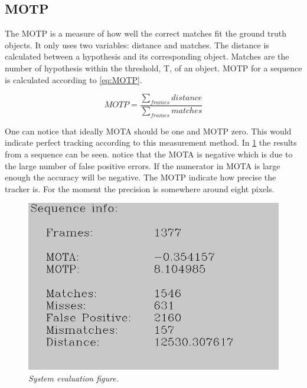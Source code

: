 \subsection{MOTP}
The MOTP is a measure of how well the correct matches fit the ground truth objects. It only uses two variables: distance and matches. The distance is calculated between a hypothesis and its corresponding object. Matches are the number of hypothesis within the 
threshold, T, of an object. MOTP for a sequence is calculated according to \eqref{eq:MOTP}.

\begin{equation}
\label{eq:MOTP}
MOTP = \frac{\sum_{frames}{distance}}{\sum_{frames}{matches}}
\end{equation}

One can notice that ideally MOTA should be one and MOTP zero. This would indicate perfect tracking according to this measurement method. In \ref{fig:system_evaluation_fig} the results from a sequence can be seen. notice that the MOTA is negative which is due to the large number of false positive errors. If the numerator in MOTA is large enough the accuracy will be negative. The MOTP indicate how precise the tracker is. For the moment the precision is somewhere around eight pixels.

\newpage
\begin{figure}[htb]
	\centering
	\includegraphics[width=\linewidth]{images/sequenceEvaluation}
	\caption{\textit{System evaluation figure.}}
	\label{fig:system_evaluation_fig} %
\end{figure}



